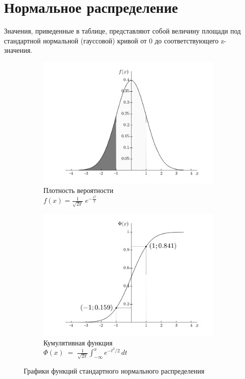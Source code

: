 \documentclass[12pt,a4paper]{article}
\begin{document}
\section{Нормальное распределение}
\small
Значения, приведенные в таблице, представляют собой величину площади под  стандартной нормальной (гауссовой) кривой от 0 до соответствующего z-значения. 
\begin{figure}[H]
\centering
	\begin{subfigure}[t]{6cm}
		\centering
		\includegraphics[scale=0.4]{img/normal_pdf.png}
		\caption{Плотность вероятности\\$f(x) = \frac{1}{\sqrt{2\pi} } \; e^{-\frac{x^2}{2}}$}
\label{fig:a_normal_pdf}	
	\end{subfigure}
	\begin{subfigure}[t]{7cm}
		\centering
		\includegraphics[scale=0.4]{img/normal_cdf.png}
		\caption{Кумулятивная функция\\$\Phi(x)\; = \;\frac{1}{\sqrt{2\pi}} \int_{-\infty}^x e^{-t^2/2} \, dt$}
\label{fig:b_normal_cdf}
	\end{subfigure}
	\caption{Графики функций стандартного нормального распределения}\label{fig:df_and_cdf}
\end{figure}
\end{document}
